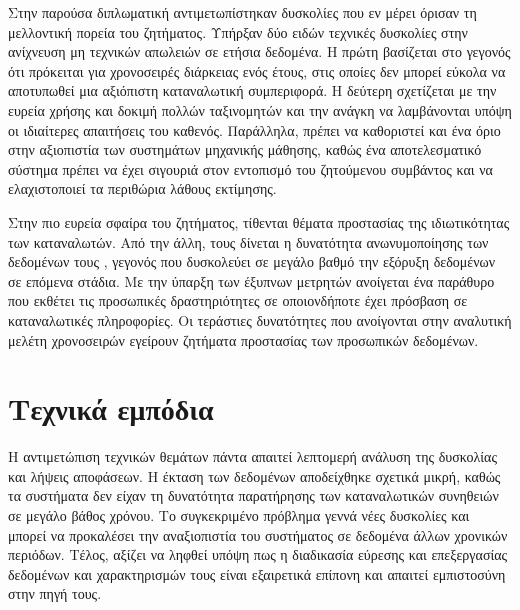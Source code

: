 Στην παρούσα διπλωματική αντιμετωπίστηκαν δυσκολίες που εν μέρει όρισαν τη μελλοντική πορεία του ζητήματος. Υπήρξαν δύο ειδών τεχνικές δυσκολίες στην ανίχνευση μη τεχνικών απωλειών σε ετήσια δεδομένα. Η πρώτη βασίζεται στο γεγονός ότι πρόκειται για χρονοσειρές διάρκειας ενός έτους, στις οποίες δεν μπορεί εύκολα να αποτυπωθεί μια αξιόπιστη καταναλωτική συμπεριφορά. Η δεύτερη σχετίζεται με την ευρεία χρήσης και δοκιμή πολλών ταξινομητών και την ανάγκη να λαμβάνονται υπόψη οι ιδιαίτερες απαιτήσεις του καθενός. Παράλληλα, πρέπει να καθοριστεί και ένα όριο στην αξιοπιστία των συστημάτων μηχανικής μάθησης, καθώς ένα αποτελεσματικό σύστημα πρέπει να έχει σιγουριά στον εντοπισμό του ζητούμενου συμβάντος και να ελαχιστοποιεί τα περιθώρια λάθους εκτίμησης.\par
Στην πιο ευρεία σφαίρα του ζητήματος, τίθενται θέματα προστασίας της ιδιωτικότητας των καταναλωτών. Από την άλλη, τους δίνεται η δυνατότητα ανωνυμοποίησης των δεδομένων τους \cite{anonymization}, γεγονός που δυσκολεύει σε μεγάλο βαθμό την εξόρυξη δεδομένων σε επόμενα στάδια. Με την ύπαρξη των έξυπνων μετρητών ανοίγεται ένα παράθυρο που εκθέτει τις προσωπικές δραστηριότητες σε οποιονδήποτε έχει πρόσβαση σε καταναλωτικές πληροφορίες. Οι τεράστιες δυνατότητες που ανοίγονται στην αναλυτική μελέτη χρονοσειρών εγείρουν ζητήματα προστασίας των προσωπικών δεδομένων.
\section{Τεχνικά εμπόδια}
Η αντιμετώπιση τεχνικών θεμάτων πάντα απαιτεί λεπτομερή ανάλυση της δυσκολίας και λήψεις αποφάσεων. Η έκταση των δεδομένων αποδείχθηκε σχετικά μικρή, καθώς τα συστήματα δεν είχαν τη δυνατότητα παρατήρησης των καταναλωτικών συνηθειών σε μεγάλο βάθος χρόνου. Το συγκεκριμένο πρόβλημα γεννά νέες δυσκολίες και μπορεί να προκαλέσει την αναξιοπιστία του συστήματος σε δεδομένα άλλων χρονικών περιόδων. Τέλος, αξίζει να ληφθεί υπόψη πως η διαδικασία εύρεσης και επεξεργασίας δεδομένων και χαρακτηρισμών τους είναι εξαιρετικά επίπονη και απαιτεί εμπιστοσύνη στην πηγή τους.
